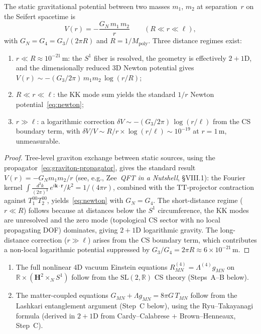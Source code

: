 \begin{corollary}
\label{cor:newton}
The static gravitational potential between two masses $m_1$, $m_2$
at separation~$r$ on the Seifert spacetime is
\begin{equation}\label{eq:newton-potential}
  V(r) = -\frac{G_N\,m_1\,m_2}{r}
  \qquad (R \ll r \ll \ell),
\end{equation}
with $G_N = G_4 = G_3/(2\pi R)$ and $R = 1/M_{\mathrm{poly}}$.
Three distance regimes exist:
\begin{enumerate}
\item $r \ll R \approx 10^{-21}$\,m: the $S^1$ fiber is resolved,
  the geometry is effectively $2{+}1$D, and the dimensionally
  reduced $3$D Newton potential gives
  $V(r) \sim -(G_3/2\pi)\,m_1 m_2\,\log(r/R)$;
\item $R \ll r \ll \ell$:
  the KK mode sum yields the standard $1/r$ Newton
  potential~\eqref{eq:newton};
\item $r \gg \ell$: a logarithmic correction
  $\delta V \sim -(G_3/2\pi)\,\log(r/\ell)$ from the CS boundary term,
  with $\delta V/V \sim R/r \times \log(r/\ell) \sim 10^{-19}$
  at $r = 1$\,m, unmeasurable.
\end{enumerate}
\end{corollary}

\begin{proof}
Tree-level graviton exchange between static sources, using the
propagator~\eqref{eq:graviton-propagator}, gives the standard result
$V(r) = -G_N m_1 m_2/r$
(see, e.g., Zee~\emph{QFT in a Nutshell}, \S VIII.1):
the Fourier kernel
$\int \frac{d^3k}{(2\pi)^3}\,e^{i\boldsymbol{k}{\cdot}\boldsymbol{r}}/k^2
= 1/(4\pi r)$,
combined with the TT-projector contraction against $T^{00}_1 T^{00}_2$,
yields~\eqref{eq:newton} with $G_N = G_4$.
The short-distance regime ($r \ll R$) follows because at distances below
the $S^1$ circumference, the KK modes are unresolved and the zero mode
(topological CS sector with no local propagating DOF) dominates,
giving $2{+}1$D logarithmic gravity.
The long-distance correction ($r \gg \ell$) arises from the CS boundary
term, which contributes a non-local logarithmic potential suppressed by
$G_3/G_4 = 2\pi R \approx 6 \times 10^{-21}$\,m.
\end{proof}

\begin{derivation}
\label{thm:nonlinear-einstein}
\leavevmode
\begin{enumerate}
\item[\emph{(Vacuum)}]
The full nonlinear $4$D vacuum Einstein equations
$R^{(4)}_{MN} = \Lambda^{(4)} g_{MN}$ on
$\mathbb{R} \times (\mathbf{H}^2 \times_N S^1)$
follow from the $\mathrm{SL}(2,\mathbb{R})$ CS theory
(Steps~A--B below).
\item[\emph{(Matter)}]
The matter-coupled equations
$G_{MN} + \Lambda g_{MN} = 8\pi G\,T_{MN}$ follow from
the Lashkari entanglement argument (Step~C below),
using the Ryu--Takayanagi formula (derived in $2{+}1$D
from Cardy--Calabrese $+$ Brown--Henneaux, Step~C).
\end{enumerate}
\end{derivation}

